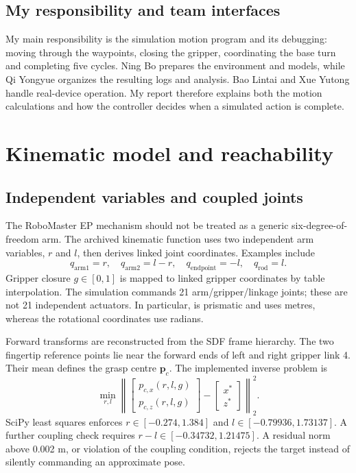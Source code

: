 
\newcommand{\studentname}{Huang Junbiao}
\newcommand{\studentcn}{黄俊彪}
\newcommand{\studentid}{24020036027}

\commonrequirements
\subsection{My responsibility and team interfaces}
My main responsibility is the simulation motion program and its debugging: moving through the waypoints, closing the gripper, coordinating the base turn and completing five cycles. Ning Bo prepares the environment and models, while Qi Yongyue organizes the resulting logs and analysis. Bao Lintai and Xue Yutong handle real-device operation. My report therefore explains both the motion calculations and how the controller decides when a simulated action is complete.
\teamtable
\commonlimits
\section{Kinematic model and reachability}
\subsection{Independent variables and coupled joints}
The RoboMaster EP mechanism should not be treated as a generic six-degree-of-freedom arm. The archived kinematic function uses two independent arm variables, $r$ and $l$, then derives linked joint coordinates. Examples include
\begin{equation}
q_{\mathrm{arm1}}=r,\quad q_{\mathrm{arm2}}=l-r,\quad
q_{\mathrm{endpoint}}=-l,\quad q_{\mathrm{rod}}=l.
\end{equation}
Gripper closure $g\in[0,1]$ is mapped to linked gripper coordinates by table interpolation. The simulation commands 21 arm/gripper/linkage joints; these are not 21 independent actuators. In particular,  is prismatic and uses metres, whereas the rotational coordinates use radians.

Forward transforms are reconstructed from the SDF frame hierarchy. The two fingertip reference points lie near the forward ends of left and right gripper link 4. Their mean defines the grasp centre $\mathbf p_c$. The implemented inverse problem is
\begin{equation}
\min_{r,l}\left\|\begin{bmatrix}p_{c,x}(r,l,g)\\p_{c,z}(r,l,g)\end{bmatrix}
-\begin{bmatrix}x^*\\z^*\end{bmatrix}\right\|_2^2.
\end{equation}
SciPy least squares enforces $r\in[-0.274,1.384]$ and $l\in[-0.79936,1.73137]$. A further coupling check requires $r-l\in[-0.34732,1.21475]$. A residual norm above 0.002 m, or violation of the coupling condition, rejects the target instead of silently commanding an approximate pose.
